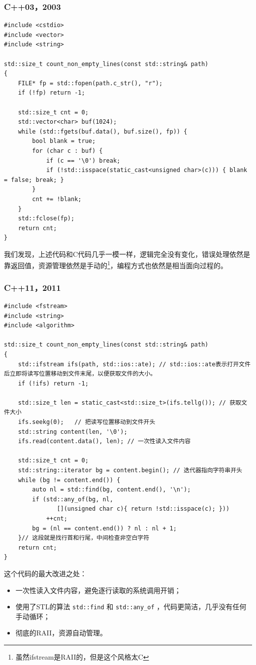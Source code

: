 \subsubsection{C++03，2003}
\begin{verbatim}
#include <cstdio>
#include <vector>
#include <string>

std::size_t count_non_empty_lines(const std::string& path)
{
    FILE* fp = std::fopen(path.c_str(), "r");
    if (!fp) return -1;

    std::size_t cnt = 0;
    std::vector<char> buf(1024);
    while (std::fgets(buf.data(), buf.size(), fp)) {
        bool blank = true;
        for (char c : buf) {
            if (c == '\0') break;
            if (!std::isspace(static_cast<unsigned char>(c))) { blank = false; break; }
        }
        cnt += !blank;
    }
    std::fclose(fp);
    return cnt;
}
\end{verbatim}

我们发现，上述代码和C代码几乎一模一样，逻辑完全没有变化，错误处理依然是靠返回值，资源管理依然是手动的\footnote{虽然ifstream是RAII的，但是这个风格太C}，编程方式也依然是相当面向过程的。

\subsubsection{C++11，2011}
\begin{verbatim}
#include <fstream>
#include <string>
#include <algorithm>

std::size_t count_non_empty_lines(const std::string& path)
{
    std::ifstream ifs(path, std::ios::ate); // std::ios::ate表示打开文件后立即将读写位置移动到文件末尾，以便获取文件的大小。
    if (!ifs) return -1;

    std::size_t len = static_cast<std::size_t>(ifs.tellg()); // 获取文件大小
    ifs.seekg(0);   // 把读写位置移动到文件开头
    std::string content(len, '\0');
    ifs.read(content.data(), len); // 一次性读入文件内容

    std::size_t cnt = 0;
    std::string::iterator bg = content.begin(); // 迭代器指向字符串开头
    while (bg != content.end()) {
        auto nl = std::find(bg, content.end(), '\n');
        if (std::any_of(bg, nl,
               [](unsigned char c){ return !std::isspace(c); }))
            ++cnt;
        bg = (nl == content.end()) ? nl : nl + 1;
    }// 这段就是找行首和行尾，中间检查非空白字符
    return cnt;
}
\end{verbatim}
这个代码的最大改进之处：
\begin{itemize}
  \item 一次性读入文件内容，避免逐行读取的系统调用开销；
  \item 使用了STL的算法 \texttt{std::find} 和 \texttt{std::any\_of} ，代码更简洁，几乎没有任何手动循环；
  \item 彻底的RAII，资源自动管理。
\end{itemize}



